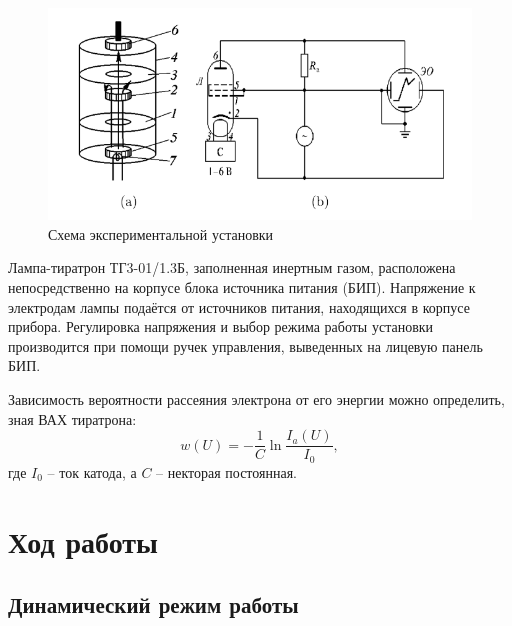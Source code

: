 	\begin{figure}[h!]
		\begin{center}
			\includegraphics[width = 14 cm]{images/setup}
			\caption{Схема экспериментальной установки}
			\label{setup1}
		\end{center}
	\end{figure}

	Лампа-тиратрон ТГ3-01/1.3Б, заполненная инертным газом, расположена непосредственно на корпусе блока источника питания (БИП). 
	Напряжение к электродам лампы подаётся от источников питания, находящихся в корпусе прибора. 
	Регулировка напряжения и выбор режима работы установки производится при помощи ручек управления, выведенных на лицевую панель БИП.
		
	Зависимость вероятности рассеяния электрона от его энергии можно определить, зная ВАХ тиратрона:
	\begin{equation}
		\label{eq:w}
		w(U) = -\frac{1}{C}\ln \frac{I_a(U)}{I_0},
	\end{equation}
	где $I_0$ -- ток катода, а $C$ -- некторая постоянная.
	
\section{Ход работы}


\subsection*{Динамический режим работы}

